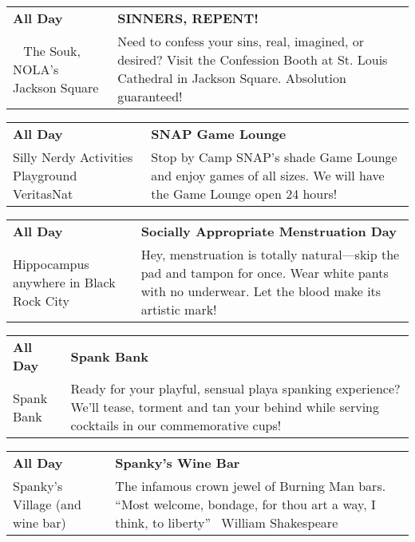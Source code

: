 \begin{tabular}{ p{1in} p{2.2in} }
    \textbf{All Day} & \textbf{SINNERS, REPENT!} \\
    ~ \newline The Souk, NOLA's Jackson Square  & Need to confess your sins, real, imagined, or desired? Visit the Confession Booth at St. Louis Cathedral in Jackson Square. Absolution guaranteed! \\
    \hline 
\end{tabular}
    
\begin{tabular}{ p{1in} p{2.2in} }
    \textbf{All Day} & \textbf{SNAP Game Lounge} \\
    Silly Nerdy Activities Playground \newline VeritasNat & Stop by Camp SNAP's shade Game Lounge and enjoy games of all sizes. We will have the Game Lounge open 24 hours! \\
    \hline 
\end{tabular}
    
\begin{tabular}{ p{1in} p{2.2in} }
    \textbf{All Day} & \textbf{Socially Appropriate Menstruation Day} \\
    Hippocampus \newline anywhere in Black Rock City & Hey, menstruation is totally natural---skip the pad and tampon for once. Wear white pants with no underwear. Let the blood make its artistic mark! \\
    \hline 
\end{tabular}
    
\begin{tabular}{ p{1in} p{2.2in} }
    \textbf{All Day} & \textbf{Spank Bank} \\
    Spank Bank \newline  & Ready for your playful, sensual playa spanking experience? We'll tease, torment and tan your behind while serving cocktails in our commemorative cups! \\
    \hline 
\end{tabular}
    
\begin{tabular}{ p{1in} p{2.2in} }
    \textbf{All Day} & \textbf{Spanky's Wine Bar} \\
    Spanky's Village (and wine bar) \newline  & The infamous crown jewel of Burning Man bars.  ``Most welcome, bondage, for thou art a way, I think, to liberty''  ~William Shakespeare~ \\
    \hline 
\end{tabular}
    
